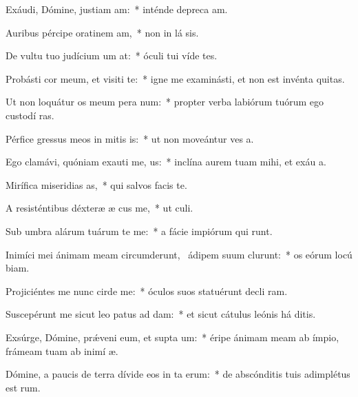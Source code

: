 \item Exáudi, Dómine, justiam am:~* inténde depreca am.
\item Auribus pércipe oratinem am,~* non in lá sis.
\item De vultu tuo judícium um at:~* óculi tui víde tes.
\item Probásti cor meum, et visiti te:~* igne me examinásti, et non est invénta   quitas.
\item Ut non loquátur os meum pera num:~* propter verba labiórum tuórum ego custodí  ras.
\item Pérfice gressus meos in mitis is:~* ut non moveántur ves a.
\item Ego clamávi, quóniam exauti me, us:~* inclína aurem tuam mihi, et exáu  a.
\item Mirífica miseridias as,~* qui salvos facis   te.
\item A resisténtibus déxteræ æ cus me,~* ut  culi.
\item Sub umbra alárum tuárum te me:~* a fácie impiórum qui  runt.
\item Inimíci mei ánimam meam circumderunt,~\pscross{} ádipem suum clurunt:~* os eórum locú  biam.
\item Projiciéntes me nunc cirde me:~* óculos suos statuérunt decli  ram.
\item Suscepérunt me sicut leo patus ad dam:~* et sicut cátulus leónis há  ditis.
\item Exsúrge, Dómine, prǽveni eum, et supta um:~* éripe ánimam meam ab ímpio, frámeam tuam ab inimí  æ.
\item Dómine, a paucis de terra dívide eos in ta erum:~* de abscónditis tuis adimplétus est  rum.
